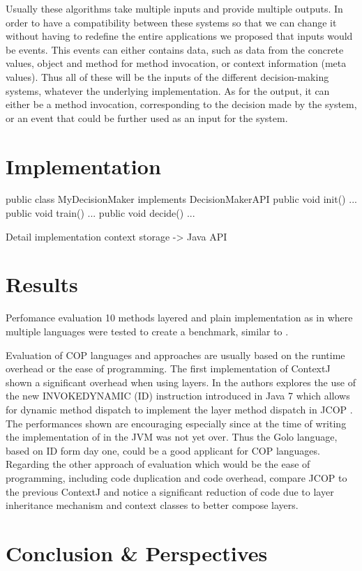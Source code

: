 \documentclass[a4paper]{article}
\begin{document}
Usually these algorithms take multiple inputs and provide multiple outputs. In order to have a compatibility between these systems so that we can change it without having to redefine the entire applications we proposed that inputs would be events. This events can either contains data, such as data from the concrete values, object and method for method invocation, or context information (meta values). Thus all of these will be the inputs of the different decision-making systems, whatever the underlying implementation. As for the output, it can either be a method invocation, corresponding to the decision made by the system, or an event that could be further used as an input for the system.

\section{Implementation}
\label{section:implementation}
public class MyDecisionMaker implements DecisionMakerAPI {
  public void init() { ... }
  public void train() { ... }
  public void decide() { ... }
}

Detail implementation
context storage -> Java API

\section{Results}
\label{section:results}

Perfomance evaluation
10 methods layered and plain implementation as in \cite{appeltauer_comparison_2009} where multiple languages were tested to create a benchmark, similar to \cite{kamina_eventcj:_2011}.

Evaluation of COP languages and approaches are usually based on the runtime overhead or the ease of programming. The first implementation of ContextJ \cite{haupt_contextj:_2011} shown a significant overhead when using layers. In \cite{appeltauer_layered_2010} the authors explores the use of the new INVOKEDYNAMIC (ID) instruction introduced in Java 7 which allows for dynamic method dispatch to implement the layer method dispatch in JCOP \cite{appeltauer_declarative_2013}. The performances shown are encouraging especially since at the time of writing the implementation of in the JVM was not yet over. Thus the Golo language, based on ID form day one, could be a good applicant for COP languages. Regarding the other approach of evaluation which would be the ease of programming, including code duplication and code overhead, \cite{appeltauer_declarative_2013} compare JCOP to the previous ContextJ and notice a significant reduction of code due to layer inheritance mechanism and context classes to better compose layers.

\section{Conclusion \& Perspectives}
\label{section:conclusion}


%
%



\end{document}
